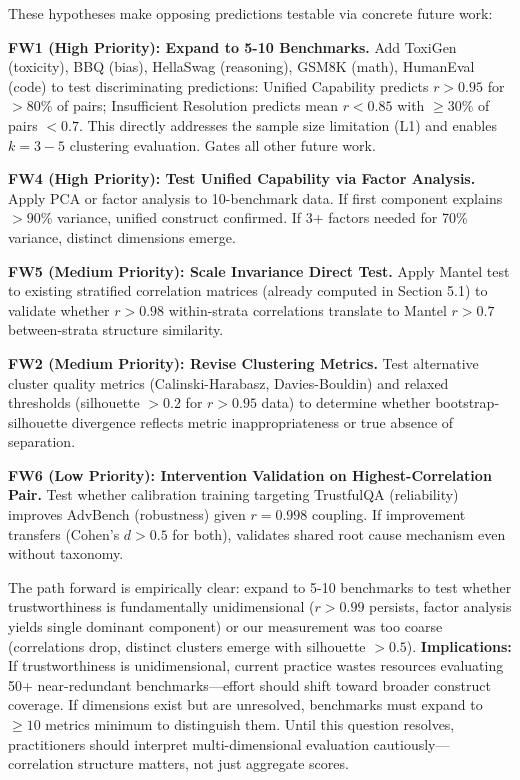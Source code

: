 These hypotheses make opposing predictions testable via concrete future work:

\textbf{FW1 (High Priority): Expand to 5-10 Benchmarks.} Add ToxiGen (toxicity), BBQ (bias), HellaSwag (reasoning), GSM8K (math), HumanEval (code) to test discriminating predictions: Unified Capability predicts $r > 0.95$ for $>80\%$ of pairs; Insufficient Resolution predicts mean $r < 0.85$ with $\geq 30\%$ of pairs $< 0.7$. This directly addresses the sample size limitation (L1) and enables $k=3-5$ clustering evaluation. Gates all other future work.

\textbf{FW4 (High Priority): Test Unified Capability via Factor Analysis.} Apply PCA or factor analysis to 10-benchmark data. If first component explains $>90\%$ variance, unified construct confirmed. If 3+ factors needed for 70\% variance, distinct dimensions emerge.

\textbf{FW5 (Medium Priority): Scale Invariance Direct Test.} Apply Mantel test to existing stratified correlation matrices (already computed in Section 5.1) to validate whether $r > 0.98$ within-strata correlations translate to Mantel $r > 0.7$ between-strata structure similarity.

\textbf{FW2 (Medium Priority): Revise Clustering Metrics.} Test alternative cluster quality metrics (Calinski-Harabasz, Davies-Bouldin) and relaxed thresholds (silhouette $> 0.2$ for $r > 0.95$ data) to determine whether bootstrap-silhouette divergence reflects metric inappropriateness or true absence of separation.

\textbf{FW6 (Low Priority): Intervention Validation on Highest-Correlation Pair.} Test whether calibration training targeting TrustfulQA (reliability) improves AdvBench (robustness) given $r = 0.998$ coupling. If improvement transfers (Cohen's $d > 0.5$ for both), validates shared root cause mechanism even without taxonomy.

The path forward is empirically clear: expand to 5-10 benchmarks to test whether trustworthiness is fundamentally unidimensional ($r > 0.99$ persists, factor analysis yields single dominant component) or our measurement was too coarse (correlations drop, distinct clusters emerge with silhouette $> 0.5$). \textbf{Implications:} If trustworthiness is unidimensional, current practice wastes resources evaluating 50+ near-redundant benchmarks---effort should shift toward broader construct coverage. If dimensions exist but are unresolved, benchmarks must expand to $\geq 10$ metrics minimum to distinguish them. Until this question resolves, practitioners should interpret multi-dimensional evaluation cautiously---correlation structure matters, not just aggregate scores.

